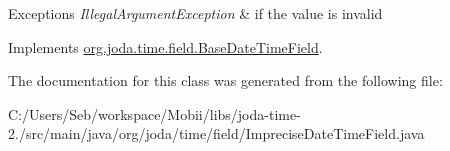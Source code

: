 \begin{DoxyExceptions}{Exceptions}
{\em Illegal\-Argument\-Exception} & if the value is invalid \\
\hline
\end{DoxyExceptions}


Implements \hyperlink{classorg_1_1joda_1_1time_1_1field_1_1_base_date_time_field_ace20661fb97d7f15a921bcc8999aa1fc}{org.\-joda.\-time.\-field.\-Base\-Date\-Time\-Field}.



The documentation for this class was generated from the following file\-:\begin{DoxyCompactItemize}
\item 
C\-:/\-Users/\-Seb/workspace/\-Mobii/libs/joda-\/time-\/2./src/main/java/org/joda/time/field/Imprecise\-Date\-Time\-Field.\-java\end{DoxyCompactItemize}

